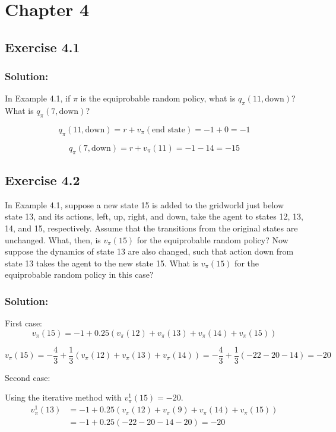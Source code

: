\section*{Chapter 4}

\subsection*{Exercise 4.1}

\subsubsection*{Solution:}
In Example 4.1, if $\pi$ is the equiprobable random policy, what is $q_\pi(11, \text{down})$?
What is $q_\pi(7, \text{down})$?

\[
q_\pi(11, \text{down}) = r + v_\pi(\text{end state}) = -1 + 0 = -1
\]

\[
q_\pi(7, \text{down}) = r + v_\pi(11) = -1 - 14 = -15
\]


\subsection*{Exercise 4.2}
In Example 4.1, suppose a new state 15 is added to the gridworld just below
state 13, and its actions, left, up, right, and down, take the agent to states 12, 13, 14,
and 15, respectively. Assume that the transitions from the original states are unchanged.
What, then, is $v_\pi(15)$ for the equiprobable random policy? Now suppose the dynamics of
state 13 are also changed, such that action down from state 13 takes the agent to the new
state 15. What is $v_\pi(15)$ for the equiprobable random policy in this case?

\subsubsection*{Solution:}
First case:
\[
v_\pi(15) = -1 + 0.25(v_\pi(12) + v_\pi(13) + v_\pi(14) + v_\pi(15))
\]

\[
v_\pi(15) = -\frac{4}{3} + \frac{1}{3}(v_\pi(12) + v_\pi(13) + v_\pi(14) ) = -\frac{4}{3} + \frac{1}{3}(-22 - 20 - 14) = -20
\]

Second case:

Using the iterative method with $v_\pi^1(15) = -20$.
\begin{align*}
v_\pi^1(13) &= -1 + 0.25(v_\pi(12) + v_\pi(9) + v_\pi(14) + v_\pi(15)) \\
&= -1 + 0.25(-22 - 20 - 14 - 20) = -20
\end{align*}

